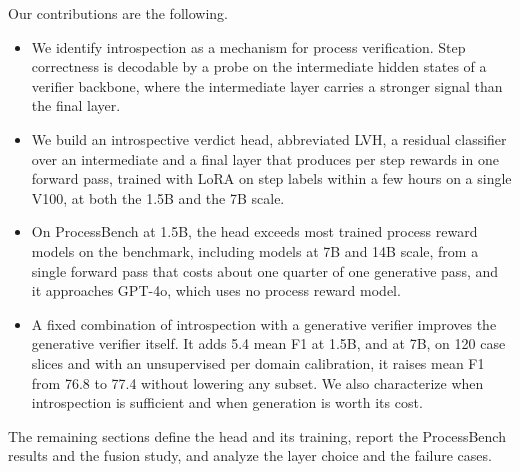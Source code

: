 Our contributions are the following.
\begin{itemize}
  \item We identify introspection as a mechanism for process verification. Step correctness is decodable by a probe on the intermediate hidden states of a verifier backbone, where the intermediate layer carries a stronger signal than the final layer.
  \item We build an introspective verdict head, abbreviated LVH, a residual classifier over an intermediate and a final layer that produces per step rewards in one forward pass, trained with LoRA on step labels within a few hours on a single V100, at both the 1.5B and the 7B scale.
  \item On ProcessBench at 1.5B, the head exceeds most trained process reward models on the benchmark, including models at 7B and 14B scale, from a single forward pass that costs about one quarter of one generative pass, and it approaches GPT-4o, which uses no process reward model.
  \item A fixed combination of introspection with a generative verifier improves the generative verifier itself. It adds 5.4 mean F1 at 1.5B, and at 7B, on 120 case slices and with an unsupervised per domain calibration, it raises mean F1 from 76.8 to 77.4 without lowering any subset. We also characterize when introspection is sufficient and when generation is worth its cost.
\end{itemize}

The remaining sections define the head and its training, report the ProcessBench results and the fusion study, and analyze the layer choice and the failure cases.
